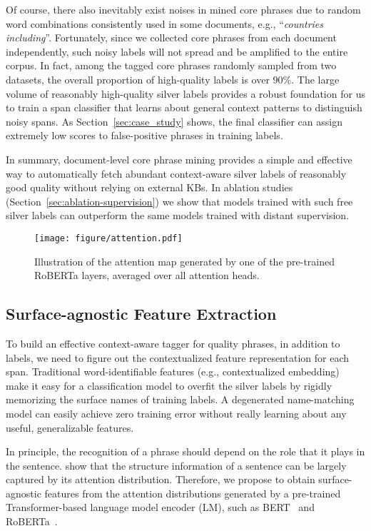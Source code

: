\documentclass[sigconf]{acmart}
\newcommand{\eg}{\mbox{e.g.}\xspace}
\newcommand{\example}[1]{``\emph{#1}''}
\begin{document}
Of course, there also inevitably exist noises in mined core phrases due to random word combinations consistently used in some documents, \eg, \example{countries including}.
Fortunately, since we collected core phrases from each document independently, such noisy labels will not spread and be amplified to the entire corpus.
In fact, among the tagged core phrases randomly sampled from two datasets, the overall proportion of high-quality labels is over $90\%$.
The large volume of reasonably high-quality silver labels provides a robust foundation for us to train a span classifier that learns about general context patterns to distinguish noisy spans.
As Section~\ref{sec:case_study} shows, the final classifier can assign extremely low scores to false-positive phrases in training labels.

In summary, document-level core phrase mining provides a simple and effective way to automatically fetch abundant context-aware silver labels of reasonably good quality without relying on external KBs.
In ablation studies (Section~\ref{sec:ablation-supervision}) we show that models trained with such free silver labels can outperform the same models trained with distant supervision.


\begin{figure}[t]
    \centering
    \texttt{[image: figure/attention.pdf]}
    \caption{
    Illustration of the attention map generated by one of the pre-trained RoBERTa layers, averaged over all attention heads.
    }\label{fig:attention}\vspace{-2mm}
\end{figure}


\subsection{Surface-agnostic Feature Extraction}
\label{sec:attentionfeature}

To build an effective context-aware tagger for quality phrases, in addition to labels, we need to figure out the contextualized feature representation for each span.
Traditional word-identifiable features (\eg, contextualized embedding) make it easy for a classification model to overfit the silver labels by rigidly memorizing the surface names of training labels.
A degenerated name-matching model can easily achieve zero training error without really learning about any useful, generalizable features.

In principle, the recognition of a phrase should depend on the role that it plays in the sentence.
\citet{kim2019pre} show that the structure information of a sentence can be largely captured by its attention distribution.
Therefore, we propose to obtain surface-agnostic features from the attention distributions generated by a pre-trained Transformer-based language model encoder (LM), such as BERT~\cite{devlin2019bert} and RoBERTa~\cite{liu2019roberta}.
\end{document}
